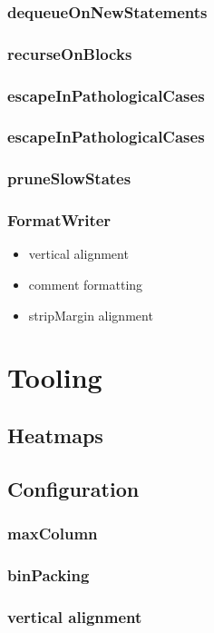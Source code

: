 \documentclass[11pt,a4paper]{article}
\begin{document}
\subsubsection{dequeueOnNewStatements}
\subsubsection{recurseOnBlocks}
\subsubsection{escapeInPathologicalCases}
\subsubsection{escapeInPathologicalCases}
\subsubsection{pruneSlowStates}
\subsubsection{FormatWriter}
\begin{itemize}
  \item vertical alignment
  \item comment formatting
  \item stripMargin alignment
\end{itemize}
\section{Tooling}\label{sec:tooling}
\subsection{Heatmaps}
\subsection{Configuration}
\subsubsection{maxColumn}
\subsubsection{binPacking}
\subsubsection{vertical alignment}
\end{document}

